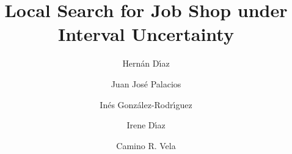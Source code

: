\documentclass[preprint]{elsarticle}
\begin{document}
\begin{frontmatter}
\title{\bf Local Search for Job Shop under Interval Uncertainty}

\author[Her]{Hern\'an D\'{\i}az}

\author[Jua]{Juan Jos\'e Palacios}

\author[Ine]{In\'es Gonz\'alez-Rodr\'{\i}guez}

\author[Ire]{Irene D\'{\i}az}

\author[Cam]{Camino R. Vela}

\address[Her,Jua,Ire,Cam]{Department of Computing, University of Oviedo, Campus de Gij\'on, 33204, Gij\'on, (Spain), Tel: +34 985182479}
\address[Ine]{Dept. of Mathematics, Statistics and Computing, University of Cantabria, Av. Los Castros s/n, 39011, Santander (Spain), Tel: +34 942202201}

\begin{abstract}
\end{abstract}


\end{frontmatter}
\end{document}
